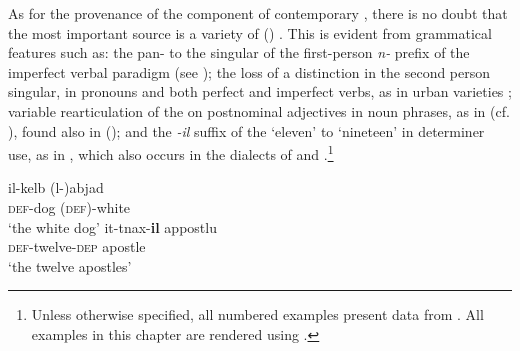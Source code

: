 \documentclass[output=paper]{langsci/langscibook}
\begin{document}
As for the provenance of the  component of contemporary , there is no doubt that the most important source is a variety of  () . This is evident from grammatical features such as: the pan-  to the singular of the first-person \textit{n-} prefix of the imperfect verbal paradigm
(see ); the loss of a  distinction in the second person singular, in pronouns and both perfect and imperfect verbs, as in urban   varieties \citep{Gibson2011}; variable rearticulation of the   on postnominal adjectives in  noun phrases, as in  (cf. \citealt{Gatt2018}), found also in   (\citealt[205]{Harrell2004}); and the \textit{-il} suffix of the  `eleven' to `nineteen' in determiner use, as in , which also occurs in the  dialects of  \citep{Caubet2011} and  \citep{Taine-Cheikh2011numerals}.\footnote{Unless otherwise specified, all numbered examples present data from . All  examples in this chapter are rendered using   .}


\begin{table}
\caption{First-person imperfect `write' in Eastern and Western Arabic}
\label{niktib}
\end{table}


\ea\label{ex:optionalarticle}
\gll il-kelb (l-)abjad\\
     \textsc{def}-dog (\textsc{def})-white\\
\glt `the white dog'
\z
\ea\label{ex:apostles}
\gll it-tnax-\textbf{il} appostlu\\
     \textsc{def}-twelve-\textsc{dep} apostle\\
\glt `the twelve apostles'
\z
\end{document}
